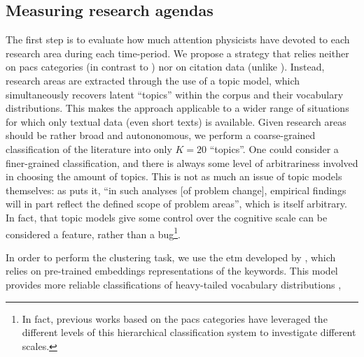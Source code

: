\documentclass{article}
\begin{document}
\subsection{\label{sec:topics}Measuring research agendas}

The first step is to evaluate how much attention physicists have devoted to each research area during each time-period. We propose a strategy that relies neither on \gls{pacs} categories (in contrast to \citealt{Jia2017,Battiston2019,Aleta2019,Tripodi2020}) nor on citation data (unlike \citealt{Zeng2019}). Instead, research areas are extracted through the use of a topic model, which simultaneously recovers latent ``topics'' within the corpus and their vocabulary distributions. This makes the approach applicable to a wider range of situations for which only textual data (even short texts) is available. Given research areas should be rather broad and autononomous, we perform a coarse-grained classification of the literature into only $K=20$ ``topics''. One could consider a finer-grained classification, and there is always some level of arbitrariness involved in choosing the amount of topics. This is not as much an issue of topic models themselves: as \citet{Gieryn1978} puts it, ``in such analyses [of problem change], empirical findings will in part reflect the defined scope of problem areas'', which is itself arbitrary. In fact, that topic models give some control over the cognitive scale can be considered a feature, rather than a bug\footnote{In fact, previous works based on the \gls{pacs} categories have leveraged the different levels of this hierarchical classification system to investigate different scales.}.

In order to perform the clustering task, we use the \gls{etm} developed by \citealt{Dieng2020}, which relies on pre-trained embeddings representations of the keywords. This model provides more reliable classifications of heavy-tailed vocabulary distributions%
,%
\end{document}

